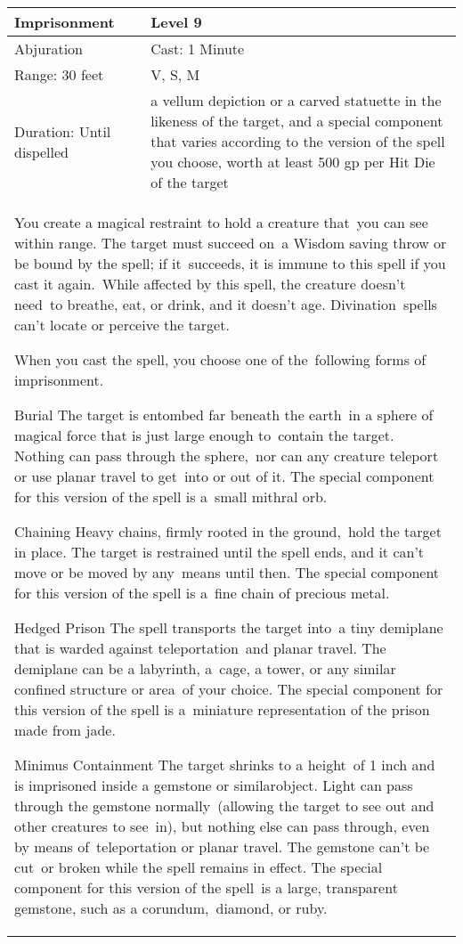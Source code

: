 \documentclass[11pt]{report}
\begin{document}
\begin{table}[H]
	\begin{tabular}{||p{6cm}|p{6cm}||}
		\hline\hline
		\bf{Imprisonment} & Level 9\\ \hline
		Abjuration & Cast: 1 Minute\\ \hline
		Range: 30 feet & V, S, M\\ \hline
		Duration: Until dispelled & a vellum depiction or a carved statuette in the likeness of the target, and a special component that varies according to the version of the spell you choose, worth at least 500 gp per Hit Die of the target\\ \hline
		\multicolumn{2}{||p{12cm}||}{You create a magical restraint to hold a creature that you can see within range.
The target must succeed on a Wisdom saving throw or be bound by the spell; if it succeeds, it is immune to this spell if you cast it again. While affected by this spell, the creature doesn't need to breathe, eat, or drink, and it doesn’t age. Divination spells can’t locate or perceive the target.

When you cast the spell, you choose one of the following forms of imprisonment. 

Burial
The target is entombed far beneath the earth in a sphere of magical force that is just large enough to contain the target. Nothing can pass through the sphere, nor can any creature teleport or use planar travel to get into or out of it.
The special component for this version of the spell is a small mithral orb.

Chaining
Heavy chains, firmly rooted in the ground, hold the target in place. The target is restrained until the spell ends, and it can’t move or be moved by any means until then.
The special component for this version of the spell is a fine chain of precious metal.

Hedged Prison
The spell transports the target into a tiny demiplane that is warded against teleportation and planar travel. The demiplane can be a labyrinth, a cage, a tower, or any similar confined structure or area of your choice.
The special component for this version of the spell is a miniature representation of the prison made from jade.

Minimus Containment
The target shrinks to a height of 1 inch and is imprisoned inside a gemstone or similarobject. Light can pass through the gemstone normally (allowing the target to see out and other creatures to see in), but nothing else can pass through, even by means of teleportation or planar travel. The gemstone can’t be cut or broken while the spell remains in effect.
The special component for this version of the spell is a large, transparent gemstone, such as a corundum, diamond, or ruby.

}
\end{tabular}
\end{table}
\end{document}
